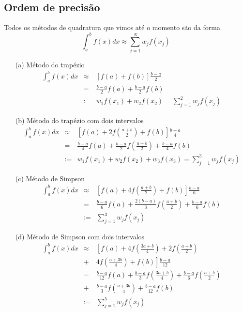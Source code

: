 \subsection{Ordem de precisão}

Todos os métodos de quadratura que vimos até o momento são da forma
$$\int_a^b f(x)dx \approx \sum_{j=1}^N w_j f(x_j)$$
\begin{ex}
\begin{itemize}
\item[(a)] Método do trapézio
\begin{eqnarray*}
\int_a^b f(x)dx &\approx& \left[f(a)+f(b)\right]\frac{b-a}{2}\\
&=&\frac{b-a}{2}f(a)+\frac{b-a}{2}f(b)\\
&:=&w_1f(x_1)+w_2f(x_2)= \sum_{j=1}^2 w_j f(x_j)
\end{eqnarray*}

\item[(b)] Método do trapézio com dois intervalos
\begin{eqnarray*}
\int_a^b f(x)dx &\approx& \left[f(a)+2f\left(\frac{a+b}{2}\right)+f(b)\right]\frac{b-a}{4}\\
&=&\frac{b-a}{4}f(a)+\frac{b-a}{2}f\left(\frac{a+b}{2}\right)+\frac{b-a}{4}f(b)\\
&:=&w_1f(x_1)+w_2f(x_2)+w_3f(x_3)= \sum_{j=1}^3 w_j f(x_j)
\end{eqnarray*}

\item[(c)] Método de Simpson
\begin{eqnarray*}
\int_a^b f(x)dx &\approx& \left[f(a)+4f\left(\frac{a+b}{2}\right)+f(b)\right]\frac{b-a}{6}\\
&=&\frac{b-a}{6}f(a)+\frac{2(b-a)}{3}f\left(\frac{a+b}{2}\right)+\frac{b-a}{6}f(b)\\
&:=&\sum_{j=1}^3 w_j f(x_j)
\end{eqnarray*}

\item[(d)] Método de Simpson com dois intervalos
\begin{eqnarray*}
\int_a^b f(x)dx &\approx& \left[f(a)+4f\left(\frac{3a+b}{4}\right)+2f\left(\frac{a+b}{2}\right)\right.\\
&+& \left. 4f\left(\frac{a+3b}{4}\right)+f(b)\right]\frac{b-a}{12}\\
&=&\frac{b-a}{12}f(a)+\frac{b-a}{3}f\left(\frac{3a+b}{4}\right)+\frac{b-a}{6}f\left(\frac{a+b}{2}\right)\\
&+&\frac{b-a}{3}f\left(\frac{a+3b}{4}\right)+\frac{b-a}{12}f(b)\\
&:=&\sum_{j=1}^5 w_j f(x_j)
\end{eqnarray*}

\end{itemize}
\end{ex}

